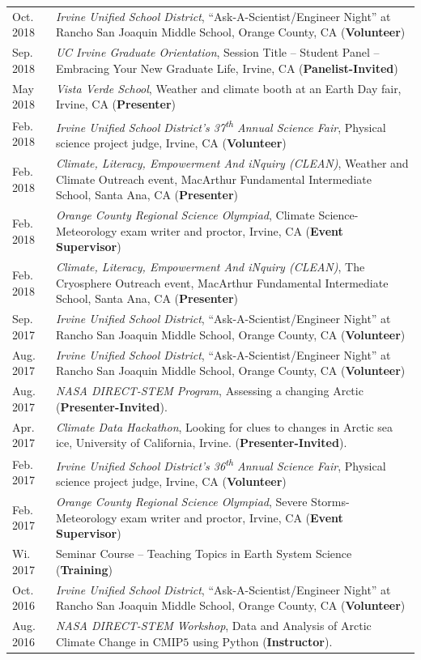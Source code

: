 \documentclass[margin,line,palatino,courier,10pt]{res}
\begin{document}
\begin{resume}
\begin{tabular}{@{}p{0.9in}p{4in}}
Oct. 2018 & \textit{Irvine Unified School District}, ``Ask-A-Scientist/Engineer Night'' at Rancho San Joaquin Middle School, Orange County, CA (\textbf{Volunteer})\\
Sep. 2018 & \textit{UC Irvine Graduate Orientation}, Session Title -- Student Panel -- Embracing Your New Graduate Life, Irvine, CA (\textbf{Panelist-Invited})\\
May 2018 & \textit{Vista Verde School}, Weather and climate booth at an Earth Day fair, Irvine, CA (\textbf{Presenter})\\
Feb. 2018 & \textit{Irvine Unified School District's 37\textsuperscript{th} Annual Science Fair}, Physical science project judge, Irvine, CA (\textbf{Volunteer})\\
Feb. 2018 & \textit{Climate, Literacy, Empowerment And iNquiry (CLEAN)}, Weather and Climate Outreach event, MacArthur Fundamental Intermediate School, Santa Ana, CA (\textbf{Presenter})\\
Feb. 2018 & \textit{Orange County Regional Science Olympiad}, Climate Science-Meteorology exam writer and proctor, Irvine, CA (\textbf{Event Supervisor})\\
Feb. 2018 & \textit{Climate, Literacy, Empowerment And iNquiry (CLEAN)}, The Cryosphere Outreach event, MacArthur Fundamental Intermediate School, Santa Ana, CA (\textbf{Presenter})\\
Sep. 2017 & \textit{Irvine Unified School District}, ``Ask-A-Scientist/Engineer Night'' at Rancho San Joaquin Middle School, Orange County, CA (\textbf{Volunteer})\\
Aug. 2017 & \textit{Irvine Unified School District}, ``Ask-A-Scientist/Engineer Night'' at Rancho San Joaquin Middle School, Orange County, CA (\textbf{Volunteer})\\
Aug. 2017 & \textit{NASA DIRECT-STEM Program}, Assessing a changing Arctic (\textbf{Presenter-Invited}).\\
Apr. 2017 & \textit{Climate Data Hackathon}, Looking for clues to changes in Arctic 
sea ice, University of California, Irvine. (\textbf{Presenter-Invited}).\\
Feb. 2017 & \textit{Irvine Unified School District's 36\textsuperscript{th} Annual Science Fair}, Physical science project judge, Irvine, CA (\textbf{Volunteer})\\
Feb. 2017 & \textit{Orange County Regional Science Olympiad}, Severe Storms-Meteorology exam writer and proctor, Irvine, CA (\textbf{Event Supervisor})\\
Wi. 2017 & Seminar Course -- Teaching Topics in Earth System Science (\textbf{Training})\\
Oct. 2016 & \textit{Irvine Unified School District}, ``Ask-A-Scientist/Engineer Night'' at Rancho San Joaquin Middle School, Orange County, CA (\textbf{Volunteer})\\
Aug. 2016 & \textit{NASA DIRECT-STEM Workshop}, Data and Analysis of Arctic Climate Change in CMIP$5$ using Python (\textbf{Instructor}).\\
\end{tabular}


\end{resume}
\end{document}
